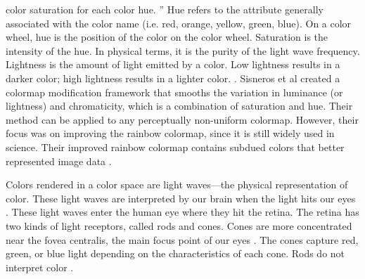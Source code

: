 \documentclass[journal]{IEEEtran}
\begin{document}
color saturation for each color hue. \cite{colormapping}”
Hue refers to the attribute generally associated with the color name (i.e. red,
orange, yellow, green, blue). On a color wheel, hue is the position of the color
on the color wheel. Saturation is the intensity of the hue. In
physical terms, it is the purity of the light wave frequency. Lightness is the
amount of light emitted by a color. Low lightness results in a darker color;
high lightness results in a lighter color. \cite{colorguidelines}.
Sisneros et al created a colormap modification framework that smooths the variation
in luminance (or lightness) and chromaticity, which is a combination of saturation
and hue. Their method can be applied to any perceptually non-uniform colormap.
However, their focus was on improving the rainbow colormap, since it is still widely
used in science. Their improved rainbow colormap contains subdued colors that better
represented image data \cite{chasingrainbows}. 
\par
Colors rendered in a color space are light waves---the
physical representation of color. These light waves are
interpreted by our brain when the light hits our eyes
\cite{viridis}. These light waves enter the human eye where
they hit the retina. The retina has two kinds of light
receptors, called rods and cones. Cones are more concentrated near the fovea centralis, the main focus point
of our eyes \cite{!SOURCE}. The cones capture red, green,
or blue light depending on the characteristics of each
cone. Rods do not interpret color \cite{colormapping}.

\end{document}
